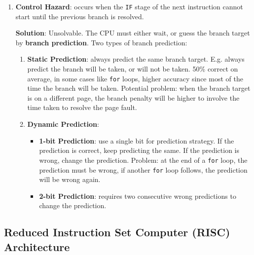 \begin{enumerate}
    \item \textbf{Control Hazard}: occurs when the \texttt{IF} stage of the next instruction cannot start
        until the previous branch is resolved.

        \textbf{Solution}: Unsolvable. The CPU must either wait, or guess the branch target by \textbf{branch
        prediction}. Two types of branch prediction:
        \begin{enumerate}
            \item \textbf{Static Prediction}: always predict the same branch target. E.g. always predict
                the branch will be taken, or will not be taken. 50\% correct on average, in some cases like
                \texttt{for} loops, higher accuracy since most of the time the branch will be taken.
                Potential problem: when the branch target is on a different page, the branch penalty will be
                higher to involve the time taken to resolve the page fault.
            \item \textbf{Dynamic Prediction}:
                \begin{itemize}
                    \item \textbf{1-bit Prediction}: use a single bit for prediction strategy. If the prediction
                        is correct, keep predicting the same. If the prediction is wrong, change the prediction.
                        Problem: at the end of a \texttt{for} loop, the prediction must be wrong, if another
                        \texttt{for} loop follows, the prediction will be wrong again.
                    \item \textbf{2-bit Prediction}: requires two consecutive wrong predictions to change the
                        prediction.
                \end{itemize}
        \end{enumerate}
    
\end{enumerate}

\subsection{Reduced Instruction Set Computer (RISC) Architecture}